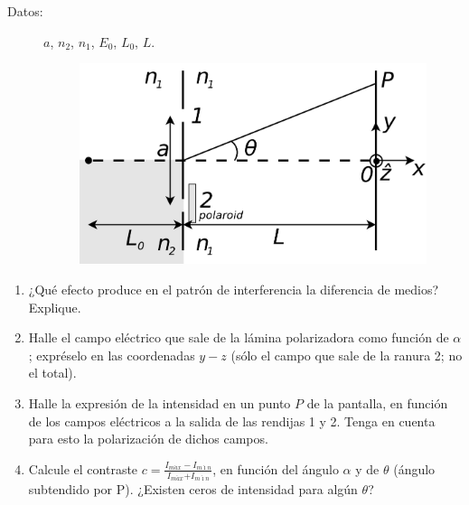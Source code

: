 \documentclass[11pt,spanish,a4paper]{article}
\begin{document}
\begin{enumerate}
\begin{description}
\item [{Datos:}] $a$, $n_{2}$, $n_{1}$, $E_{0}$, $L_{0}$, $L$.
\begin{figure}[H]
\centering{}\includegraphics[clip,scale=0.3]{ej5-7}
\end{figure}
\end{description}
\begin{enumerate}
\item ¿Qué efecto produce en el patrón de interferencia la diferencia de
medios? Explique.
\item Halle el campo eléctrico que sale de la lámina polarizadora como función
de $\alpha$; expréselo en las coordenadas $y-z$ (sólo el campo que
sale de la ranura 2; no el total).
\item Halle la expresión de la intensidad en un punto $P$ de la pantalla,
en función de los campos eléctricos a la salida de las rendijas 1
y 2. Tenga en cuenta para esto la polarización de dichos campos.
\item Calcule el contraste $c=\frac{I_{m\acute{a}x}-I_{m\acute{\imath}n}}{I_{m\acute{a}x}\text{+}I_{m\acute{\imath}n}}$,
en función del ángulo $\alpha$ y de $\theta$ (ángulo subtendido
por P). ¿Existen ceros de intensidad para algún $\theta$?
\end{enumerate}




\end{enumerate}
\end{document}
